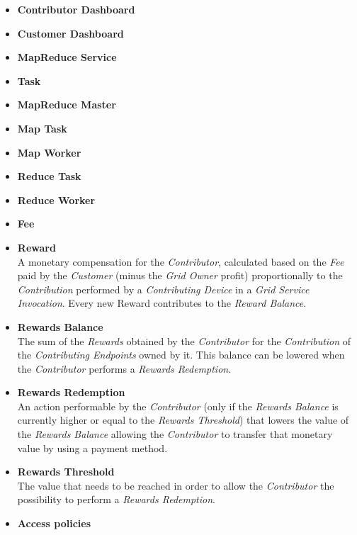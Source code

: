 \begin{itemize}
    \item \textbf{Contributor Dashboard}\label{contributor_dashboard}\\
    \item \textbf{Customer Dashboard}\label{customer_dashboard}\\
    \item \textbf{MapReduce Service}\label{mapreduce_service}\\
    \item \textbf{Task}\label{task}\\
    \item \textbf{MapReduce Master}\label{mapreduce_master}\\
    \item \textbf{Map Task}\label{map_task}\\
    \item \textbf{Map Worker}\label{map_worker}\\
    \item \textbf{Reduce Task}\label{reduce_task}\\
    \item \textbf{Reduce Worker}\label{reduce_worker}\\
    \item \textbf{Fee}\label{fee}\\
    \item \textbf{Reward}\label{reward}\\
    A monetary compensation for the \textit{Contributor}, calculated based on the \textit{Fee} paid by the \textit{Customer} (minus the \textit{Grid Owner} profit) proportionally to the \textit{Contribution} performed by a \textit{Contributing Device} in a \textit{Grid Service Invocation}. Every new Reward contributes to the \textit{Reward Balance}.
    \item \textbf{Rewards Balance}\label{rewards_balance}\\
    The sum of the \textit{Rewards} obtained by the \textit{Contributor} for the \textit{Contribution} of the \textit{Contributing Endpoints} owned by it. This balance can be lowered when the \textit{Contributor} performs a \textit{Rewards Redemption}. 
    \item \textbf{Rewards Redemption}\label{rewards_redemption}\\
    An action performable by the \textit{Contributor} (only if the \textit{Rewards Balance} is currently higher or equal to the \textit{Rewards Threshold}) that lowers the value of the \textit{Rewards Balance} allowing the \textit{Contributor} to transfer that monetary value by using a payment method.
    \item \textbf{Rewards Threshold}\label{rewards_threshold}\\
    The value that needs to be reached in order to allow the \textit{Contributor} the possibility to perform a \textit{Rewards Redemption}.
    \item \textbf{Access policies}\label{access_policies}\\
\end{itemize}

